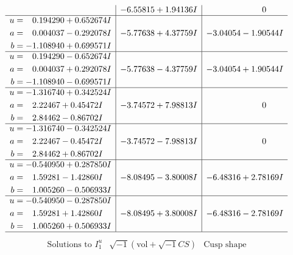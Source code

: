 \documentclass[1p]{elsarticle_modified}
\theoremstyle{definition}
\newcommand{\I}{\sqrt{-1}}
\begin{document}
$$\begin{array}{c|c|c}
 & -6.55815 + 1.94136 I & \phantom{-0.000000 } 0 \\ \hline\begin{aligned}
u &= \phantom{-}0.194290 + 0.652674 I \\
a &= \phantom{-}0.004037 - 0.292078 I \\
b &= -1.108940 + 0.699571 I\end{aligned}
 & -5.77638 + 4.37759 I & -3.04054 - 1.90544 I \\ \hline\begin{aligned}
u &= \phantom{-}0.194290 - 0.652674 I \\
a &= \phantom{-}0.004037 + 0.292078 I \\
b &= -1.108940 - 0.699571 I\end{aligned}
 & -5.77638 - 4.37759 I & -3.04054 + 1.90544 I \\ \hline\begin{aligned}
u &= -1.316740 + 0.342524 I \\
a &= \phantom{-}2.22467 + 0.45472 I \\
b &= \phantom{-}2.84462 - 0.86702 I\end{aligned}
 & -3.74572 + 7.98813 I & \phantom{-0.000000 } 0 \\ \hline\begin{aligned}
u &= -1.316740 - 0.342524 I \\
a &= \phantom{-}2.22467 - 0.45472 I \\
b &= \phantom{-}2.84462 + 0.86702 I\end{aligned}
 & -3.74572 - 7.98813 I & \phantom{-0.000000 } 0 \\ \hline\begin{aligned}
u &= -0.540950 + 0.287850 I \\
a &= \phantom{-}1.59281 - 1.42860 I \\
b &= \phantom{-}1.005260 - 0.506933 I\end{aligned}
 & -8.08495 - 3.80008 I & -6.48316 + 2.78169 I \\ \hline\begin{aligned}
u &= -0.540950 - 0.287850 I \\
a &= \phantom{-}1.59281 + 1.42860 I \\
b &= \phantom{-}1.005260 + 0.506933 I\end{aligned}
 & -8.08495 + 3.80008 I & -6.48316 - 2.78169 I\\
 \hline 
 \end{array}$$\newpage$$\begin{array}{c|c|c}  
\text{Solutions to }I^u_{1}& \I (\text{vol} + \sqrt{-1}CS) & \text{Cusp shape}\\

\end{array}$$
\end{document}

